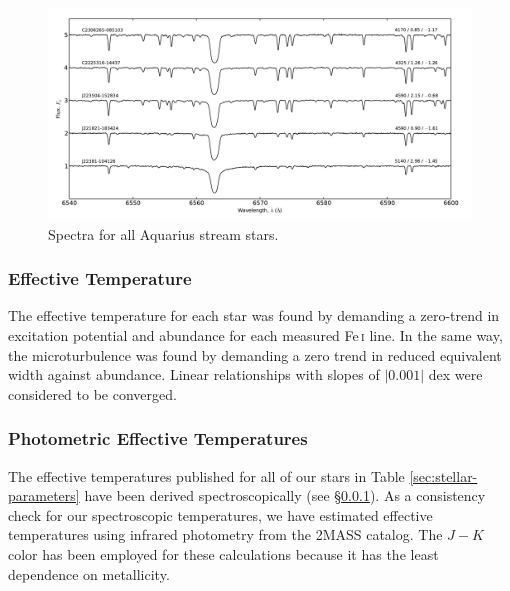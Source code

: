 \documentclass{emulateapj}
\begin{document}
\begin{figure}[t!]
	\includegraphics[width=\textwidth]{./figures/spectra-h-alpha.pdf}
	\caption{Spectra for all Aquarius stream stars.}
	\label{fig:spectra-h-alpha}
\end{figure}

\subsubsection{Effective Temperature}
\label{sec:effective-teffs}
The effective temperature for each star was found by demanding a zero-trend in excitation potential and abundance for each measured Fe\,\textsc{i} line. In the same way, the microturbulence was found by demanding a zero trend in reduced equivalent width against abundance. Linear relationships with slopes of $|0.001|$ dex were considered to be converged. 

\subsubsection{Photometric Effective Temperatures}
\label{sec:photometric-temperatures}

The effective temperatures published for all of our stars in Table \ref{sec:stellar-parameters} have been derived spectroscopically (see \S\ref{sec:effective-teffs}). As a consistency check for our spectroscopic temperatures, we have estimated effective temperatures using infrared photometry from the 2MASS catalog. The $J-K$ color has been employed for these calculations because it has the least dependence on metallicity. 
\end{document}
